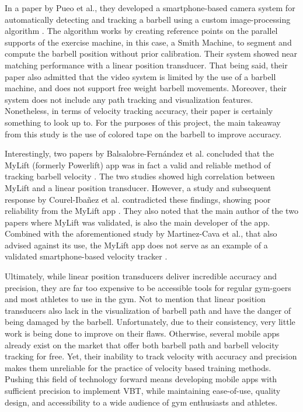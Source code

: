 \documentclass[10pt,twocolumn]{article}
\begin{document}
In a paper by Pueo et al., they developed a smartphone-based camera system for automatically detecting and tracking a barbell using a custom image-processing algorithm \cite{Pueo2021}.
The algorithm works by creating reference points on the parallel supports of the exercise machine, in this case, a Smith Machine, to segment and compute the barbell position without prior calibration.
Their system showed near matching performance with a linear position transducer.
That being said, their paper also admitted that the video system is limited by the use of a barbell machine, and does not support free weight barbell movements.
Moreover, their system does not include any path tracking and visualization features.
Nonetheless, in terms of velocity tracking accuracy, their paper is certainly something to look up to.
For the purposes of this project, the main takeaway from this study is the use of colored tape on the barbell to improve accuracy.\par

Interestingly, two papers by Balsalobre-Fern\'andez et al. concluded that the MyLift (formerly Powerlift) app was in fact a valid and reliable method of tracking barbell velocity \cite{Balsalobre-Fernández2017, Balsalobre-Fernández2018}. 
The two studies showed high correlation between MyLift and a linear position transducer.
However, a study and subsequent response by Courel-Iba\~nez et al. contradicted these findings, showing poor reliability from the MyLift app \cite{Courel-Ibáñez2020}.
They also noted that the main author of the two papers where MyLift was validated, is also the main developer of the app.
Combined with the aforementioned study by Martinez-Cava et al., that also advised against its use, the MyLift app does not serve as an example of a validated smartphone-based velocity tracker \cite{Martinez-Cava2020}.


Ultimately, while linear position transducers deliver incredible accuracy and precision, they are far too expensive to be accessible tools for regular gym-goers and most athletes to use in the gym.
Not to mention that linear position transducers also lack in the visualization of barbell path and have the danger of being damaged by the barbell.
Unfortunately, due to their consistency, very little work is being done to improve on their flaws. 
Otherwise, several mobile apps already exist on the market that offer both barbell path and barbell velocity tracking for free.
Yet, their inability to track velocity with accuracy and precision makes them unreliable for the practice of velocity based training methods.
Pushing this field of technology forward means developing mobile apps with sufficient precision to implement VBT, while maintaining ease-of-use, quality design, and accessibility to a wide audience of gym enthusiasts and athletes.

\printbibliography 
\end{document}
